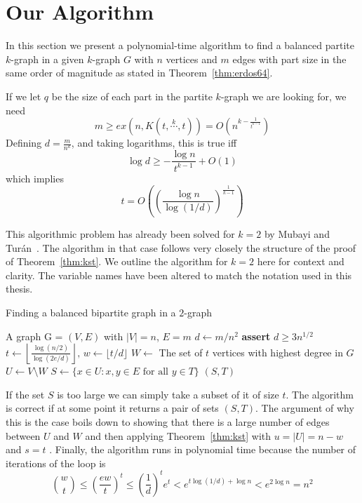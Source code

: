 \section{Our Algorithm}\label{sec:algorithm}

In this section we present a polynomial-time algorithm to find a balanced partite $k$-graph in a given $k$-graph $G$
with $n$ vertices and $m$ edges with part size in the same order of magnitude as stated in
Theorem~\ref{thm:erdos64}.

\begin{remark}
    If we let $q$ be the size of each part in the partite $k$-graph we are looking for, we need
    \[
        m \geq ex(n, K(t, \overset{k}{\cdots}, t)) = O\left(n^{k - \frac{1}{t^{k-1}}}\right)
    \]
    Defining $d = \frac{m}{n^k}$, and taking logarithms, this is true iff
    \[
        \log d \geq - \frac{\log n}{t^{k-1}} + O(1)
    \]
    which implies
    \[
        t = O\left(\left(\frac{\log n}{\log (1/d)}\right)^{\frac{1}{k-1}}\right)
    \]
\end{remark}

This algorithmic problem has already been solved for $k = 2$ by Mubayi and Turán~\cite{MUBAYI2010174}.
The algorithm in that case follows very closely the structure of the proof of Theorem~\ref{thm:kst}.
We outline the algorithm for $k = 2$ here for context and clarity.
The variable names have been altered to match the notation used in this thesis.

\begin{algorithm}
    \caption{Finding a balanced bipartite graph in a $2$-graph}
    \label{alg:bipartite}
        \begin{algorithmic}[1]
        \Require A graph G = $(V, E)$ with $|V| = n$, $E = m$
        \State $d \gets m / n^2 $
        \State \textbf{assert} $d \geq 3 n^{1/2}$
        \State $t \gets \left\lfloor\frac{\log (n/2) }{\log (2e/d)}\right\rfloor,\, w \gets \lfloor t/d \rfloor$
        \State $W \gets $ The set of $t$ vertices with highest degree in $G$
        \State $U \gets V \setminus W$
            \State $S \gets \{x \in U : {x, y} \in E \text{ for all } y \in T\}$
                \State \Return $(S, T)$
            \EndIf
        \EndFor
        \end{algorithmic}
\end{algorithm}

If the set $S$ is too large we can simply take a subset of it of size $t$.
The algorithm is correct if at some point it returns a pair of sets $(S, T)$.
The argument of why this is the case boils down to showing that there is a
large number of edges between $U$ and $W$ and then applying Theorem~\ref{thm:kst}
with $u = |U| = n - w$ and $s = t$ .
Finally, the algorithm runs in polynomial time because 
the  number of iterations of the loop is
\[
    \binom{w}{t} \leq
    \left(\frac{ew}{t}\right)^t \leq
    \left(\frac{1}{d}\right)^t e^t < e^{t \log (1/d) + \log n} <
    e^{2\log n} = n^2
\]

